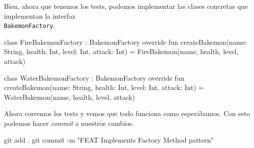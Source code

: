   Bien, ahora que tenemos los tests, podemos implementar las clases concretas que implementan la
  interfaz \\\texttt{BakemonFactory}.

  \begin{kotlin}
    class FireBakemonFactory : BakemonFactory {
      override fun createBakemon(name: String, health: Int, level: Int, attack: Int) =
        FireBakemon(name, health, level, attack)
    }
  \end{kotlin}

  \begin{kotlin}
    class WaterBakemonFactory : BakemonFactory {
      override fun createBakemon(name: String, health: Int, level: Int, attack: Int) =
        WaterBakemon(name, health, level, attack)
    }
  \end{kotlin}

  Ahora corremos los tests y vemos que todo funciona como esperábamos.
  Con esto podemos hacer \textit{commit} a nuestros cambios.

  \begin{powershell}
    git add .
    git commit -m "FEAT Implements Factory Method pattern"
  \end{powershell}
